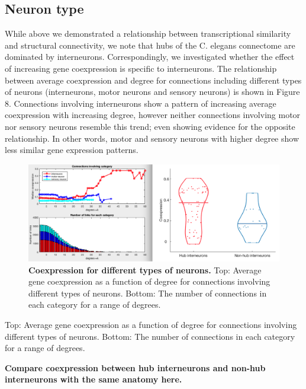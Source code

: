 \documentclass[10pt,letterpaper]{article}
\begin{document}
\subsection*{Neuron type}
While above we demonstrated a relationship between transcriptional similarity and structural connectivity, we note that hubs of the C. elegans connectome are dominated by interneurons.
Correspondingly, we investigated whether the effect of increasing gene coexpression is specific to interneurons.
The relationship between average coexpression and degree for connections including different types of neurons (interneurons, motor neurons and sensory neurons) is shown in Figure 8.
Connections involving interneurons show a pattern of increasing average coexpression with increasing degree, however neither connections involving motor nor sensory neurons resemble this trend; even showing evidence for the opposite relationship.
In other words, motor and sensory neurons with higher degree show less similar gene expression patterns.

\begin{figure}[!h]
\centering
    \includegraphics[width=1\textwidth]{coexpressionInvolvingCategory}
 \caption{{\bf Coexpression for different types of neurons. }
Top: Average gene coexpression as a function of degree for connections involving different types of neurons. Bottom: The number of connections in each category for a range of degrees.}
 \label{NeuronTypePlot}
 \end{figure}
Top: Average gene coexpression as a function of degree for connections involving different types of neurons. Bottom: The number of connections in each category for a range of degrees. 

\textbf{Compare coexpression between hub interneurons and non-hub interneurons with the same anatomy here.}
\end{document}
